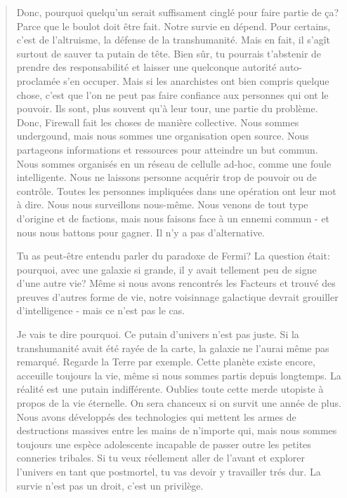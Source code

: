 \begin{quotation}
Donc, pourquoi quelqu'un serait suffisament cinglé pour faire partie de ça?
Parce que le boulot doit être fait. Notre survie en dépend. Pour certains,
c'est de l'altruisme, la défense de la transhumanité. Mais en fait, il s'agît
surtout de sauver ta putain de tête. Bien sûr, tu pourrais t'abstenir de
prendre des responsabilité et laisser une quelconque autorité auto-proclamée
s'en occuper.  Mais si les anarchistes ont bien compris quelque chose, c'est
que l'on ne peut pas faire confiance aux personnes qui ont le pouvoir. Ils
sont, plus souvent qu'à leur tour, une partie du problème. Donc, Firewall fait
les choses de manière collective. Nous sommes undergound, mais nous sommes une
organisation open source. Nous partageons informations et ressources pour
atteindre un but commun. Nous sommes organisés en un réseau de cellulle ad-hoc,
comme une foule intelligente. Nous ne laissons personne acquérir trop de
pouvoir ou de contrôle. Toutes les personnes impliquées dans une opération ont
leur mot à dire. Nous nous surveillons nous-même. Nous venons de tout type
d'origine et de factions, mais nous faisons face à un ennemi commun - et nous
nous battons pour gagner. Il n'y a pas d'alternative. 

Tu as peut-être entendu parler du paradoxe de Fermi? La question était:
pourquoi, avec une galaxie si grande, il y avait tellement peu de signe d'une
autre vie? Même si nous avons rencontrés les Facteurs et trouvé des preuves
d'autres forme de vie, notre voisinnage galactique devrait grouiller
d'intelligence - mais ce n'est pas le cas. 

Je vais te dire pourquoi. Ce putain d'univers n'est pas juste. Si la
transhumanité avait été rayée de la carte, la galaxie ne l'aurai même pas
remarqué. Regarde la Terre par exemple. Cette planète existe encore, acceuille
toujours la vie, même si nous sommes partis depuis longtemps. La réalité est
une putain indifférente. Oublies toute cette merde utopiste à propos de la vie
éternelle. On sera chanceux si on survit une année de plus. Nous avons
développés des technologies qui mettent les armes de destructions massives
entre les mains de n'importe qui, mais nous sommes toujours une espèce
adolescente incapable de passer outre les petites conneries tribales. Si tu
veux réellement aller de l'avant et explorer l'univers en tant que postmortel,
tu vas devoir y travailler trés dur. La survie n'est pas un droit, c'est un
privilège. 


\end{quotation}
